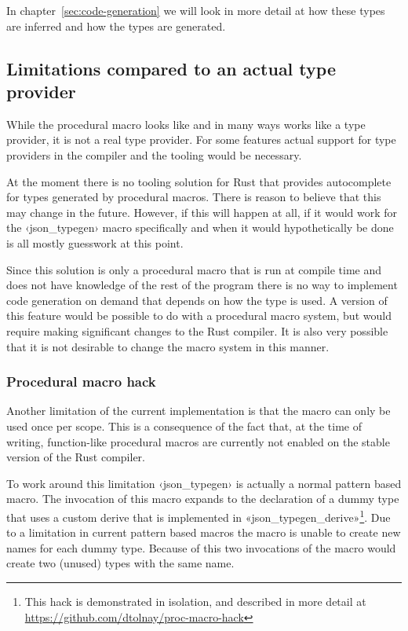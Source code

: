 In chapter~\ref{sec:code-generation} we will look in more detail at how these types are inferred and how the types are generated.

\subsection{Limitations compared to an actual type provider}
\label{sec:macro-limitations}

While the procedural macro looks like and in many ways works like a type provider, it is not a real type provider. For some features actual support for type providers in the compiler and the tooling would be necessary.

At the moment there is no tooling solution for Rust that provides autocomplete for types generated by procedural macros. There is reason to believe that this may change in the future. However, if this will happen at all, if it would work for the ‹json_typegen› macro specifically and when it would hypothetically be done is all mostly guesswork at this point.

Since this solution is only a procedural macro that is run at compile time and does not have knowledge of the rest of the program there is no way to implement code generation on demand that depends on how the type is used. A version of this feature would be possible to do with a procedural macro system, but would require making significant changes to the Rust compiler. It is also very possible that it is not desirable to change the macro system in this manner.

\subsubsection{Procedural macro hack}

Another limitation of the current implementation is that the macro can only be used once per scope. This is a consequence of the fact that, at the time of writing, function-like procedural macros are currently not enabled on the stable version of the Rust compiler.

To work around this limitation ‹json_typegen› is actually a normal pattern based macro. The invocation of this macro expands to the declaration of a dummy type that uses a custom derive that is implemented in «json_typegen_derive»\footnote{This hack is demonstrated in isolation, and described in more detail at \url{https://github.com/dtolnay/proc-macro-hack}}. Due to a limitation in current pattern based macros the macro is unable to create new names for each dummy type. Because of this two invocations of the macro would create two (unused) types with the same name.

